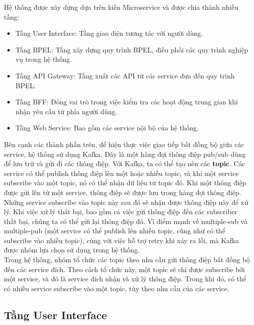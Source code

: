 Hệ thống được xây dựng dựa trên kiến Microservice và được chia thành nhiều tầng:
\begin{itemize}
    \item Tầng User Interface: Tầng giao diện tương tác với người dùng.
    \item Tầng BPEL: Tầng xây dựng quy trình BPEL, điều phối các quy trình nghiệp vụ trong hệ thống.
    \item Tầng API Gateway: Tầng xuất các API từ các service đưa đến quy trình BPEL.
    \item Tầng BFF: Đóng vai trò trong việc kiểm tra các hoạt động trung gian khi nhận yêu cầu từ phía người dùng.
    \item Tầng Web Service: Bao gồm các service nội bộ của hệ thống.
\end{itemize}
 
Bên cạnh các thành phần trên, để hiện thực việc giao tiếp bất đồng bộ giữa các service, hệ thống sử dụng Kafka. Đây là một hàng đợi thông điệp pub/sub dùng để lưu trữ và gửi đi các thông điệp. Với Kafka, ta có thể tạo nên các \textbf{topic}. Các service có thể publish thông điệp lên một hoặc nhiều topic, và khi một service subscribe vào một topic, nó có thể nhận dữ liệu từ topic đó. Khi một thông điệp được gửi lên từ một service, thông điệp sẽ được lưu trong hàng đợi thông điệp. Những service subscribe vào topic này sau đó sẽ nhận được thông điệp này để xử lý. Khi việc xử lý thất bại, bao gồm cả việc gửi thông điệp đến các subscriber thất bại, chúng ta có thể gửi lại thông điệp đó. Vì điểm mạnh về multiple-sub và multiple-pub (một service có thể publish lên nhiều topic, cũng như có thể subscribe vào nhiều topic), cùng với việc hỗ trợ retry khi xảy ra lỗi, mà Kafka được nhóm lựa chọn sử dụng trong hệ thống.\\
 
 Trong hệ thống, nhóm tổ chức các topic theo nhu cầu gửi thông điệp bất đồng bộ đến các service đích. Theo cách tổ chức này, một topic sẽ chỉ được subscribe bởi một service, và đó là service đích nhận và xử lý thông điệp. Trong khi đó, có thể có nhiều service subscribe vào một topic, tùy theo nhu cầu của các service.


\subsection{Tầng User Interface}
